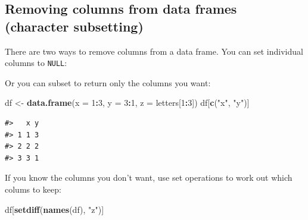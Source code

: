 \documentclass[]{book}
\newenvironment{Shaded}{\begin{snugshade}}{\end{snugshade}}
\newcommand{\KeywordTok}[1]{\textcolor[rgb]{0.13,0.29,0.53}{\textbf{#1}}}
\newcommand{\DataTypeTok}[1]{\textcolor[rgb]{0.13,0.29,0.53}{#1}}
\newcommand{\DecValTok}[1]{\textcolor[rgb]{0.00,0.00,0.81}{#1}}
\newcommand{\StringTok}[1]{\textcolor[rgb]{0.31,0.60,0.02}{#1}}
\newcommand{\OtherTok}[1]{\textcolor[rgb]{0.56,0.35,0.01}{#1}}
\newcommand{\OperatorTok}[1]{\textcolor[rgb]{0.81,0.36,0.00}{\textbf{#1}}}
\newcommand{\NormalTok}[1]{#1}
\theoremstyle{definition}
\theoremstyle{definition}
\theoremstyle{definition}
\theoremstyle{remark}
\begin{document}
\subsection{Removing columns from data frames (character
subsetting)}\label{removing-columns-from-data-frames-character-subsetting}

There are two ways to remove columns from a data frame. You can set
individual columns to \texttt{NULL}:

\begin{Shaded}
\end{Shaded}

Or you can subset to return only the columns you want:

\begin{Shaded}
\begin{Highlighting}[]
\NormalTok{df <-}\StringTok{ }\KeywordTok{data.frame}\NormalTok{(}\DataTypeTok{x =} \DecValTok{1}\OperatorTok{:}\DecValTok{3}\NormalTok{, }\DataTypeTok{y =} \DecValTok{3}\OperatorTok{:}\DecValTok{1}\NormalTok{, }\DataTypeTok{z =}\NormalTok{ letters[}\DecValTok{1}\OperatorTok{:}\DecValTok{3}\NormalTok{])}
\NormalTok{df[}\KeywordTok{c}\NormalTok{(}\StringTok{"x"}\NormalTok{, }\StringTok{"y"}\NormalTok{)]}
\end{Highlighting}
\end{Shaded}

\begin{verbatim}
#>   x y
#> 1 1 3
#> 2 2 2
#> 3 3 1
\end{verbatim}

If you know the columns you don't want, use set operations to work out
which colums to keep:

\begin{Shaded}
\begin{Highlighting}[]
\NormalTok{df[}\KeywordTok{setdiff}\NormalTok{(}\KeywordTok{names}\NormalTok{(df), }\StringTok{"z"}\NormalTok{)]}
\end{Highlighting}
\end{Shaded}
\end{document}
